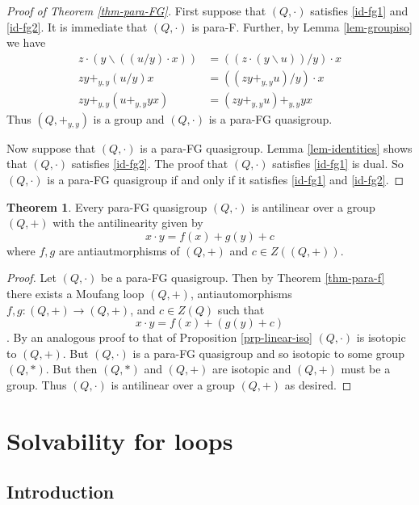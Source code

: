 \documentclass[12pt, twoside, openright]{report}
\theoremstyle{definition}
\newtheorem{thm}{Theorem}[chapter]
\newcommand{\ldv}{\backslash}       %
\newcommand{\rdv}{/}                %
\begin{document}
\begin{proof}[Proof of Theorem \ref{thm-para-FG}]
  First suppose that $(Q, \cdot)$ satisfies \ref{id-fg1} and \ref{id-fg2}. It is immediate
    that $(Q, \cdot)$ is para-F. Further, by Lemma \ref{lem-groupiso} we have
  \begin{align*}
    z\cdot (y\ldv ((u\rdv y)\cdot x)) &= ((z\cdot (y\ldv u))\rdv y)\cdot x\\
    zy +_{y, y} (u\rdv y)x &= ((zy +_{y, y} u)\rdv y) \cdot x\\
    zy +_{y, y} (u +_{y, y} yx) &= (zy +_{y, y} u) +_{y, y} yx
  \end{align*}
  Thus $(Q, +_{y, y})$ is a group and $(Q, \cdot)$ is a para-FG quasigroup.

  Now suppose that $(Q, \cdot)$ is a para-FG quasigroup. Lemma \ref{lem-identities} shows that
    $(Q, \cdot)$ satisfies \ref{id-fg2}. The proof that $(Q, \cdot)$ satisfies \ref{id-fg1} is
    dual. So $(Q, \cdot)$ is a para-FG quasigroup if and only if it satisfies \ref{id-fg1} and \ref{id-fg2}.
\end{proof}

\begin{thm}
  Every para-FG quasigroup $(Q, \cdot)$ is antilinear over a group $(Q, +)$ with the antilinearity given by
  \[x\cdot y = f(x) + g(y) + c\]
  where $f, g$ are antiautmorphisms of $(Q, +)$ and $c\in Z((Q, +))$.
\end{thm}

\begin{proof}
  Let $(Q, \cdot)$ be a para-FG quasigroup. Then by Theorem \ref{thm-para-f} there exists a Moufang
    loop $(Q, +)$, antiautomorphisms $f, g: (Q, +)\to (Q, +)$, and $c\in Z(Q)$ such that
  \[x\cdot y = f(x) + (g(y) + c)\].
  By an analogous proof to that of Proposition \ref{prp-linear-iso} $(Q, \cdot)$ is isotopic to
    $(Q, +)$. But $(Q, \cdot)$ is a para-FG quasigroup and so isotopic to some group $(Q, *)$. But
    then $(Q, *)$ and $(Q, +)$ are isotopic and $(Q, +)$ must be a group. Thus $(Q, \cdot)$ is
    antilinear over a group $(Q, +)$ as desired.
\end{proof}


\chapter{Solvability for loops}

\section{Introduction}
\end{document}
